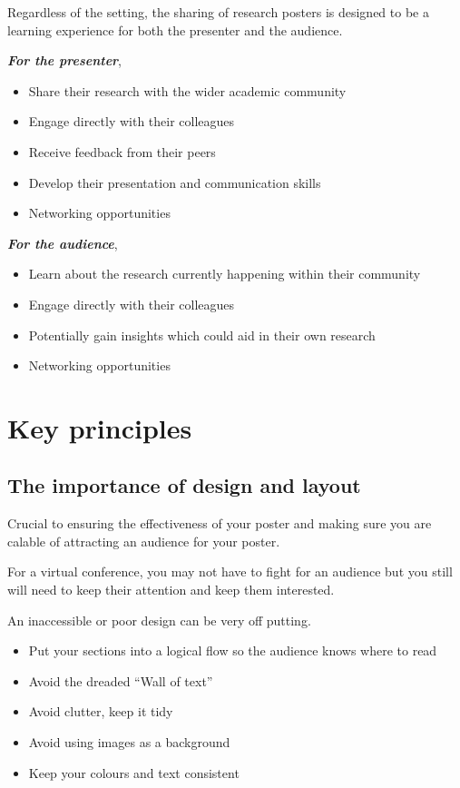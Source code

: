 \documentclass[
]{book}
\providecommand{\tightlist}{%
  \setlength{\itemsep}{0pt}\setlength{\parskip}{0pt}}
\begin{document}
Regardless of the setting, the sharing of research posters is designed to be a learning experience for both the presenter and the audience.

\textbf{\emph{For the presenter}},

\begin{itemize}
\tightlist
\item
  Share their research with the wider academic community
\item
  Engage directly with their colleagues
\item
  Receive feedback from their peers
\item
  Develop their presentation and communication skills
\item
  Networking opportunities
\end{itemize}

\textbf{\emph{For the audience}},

\begin{itemize}
\tightlist
\item
  Learn about the research currently happening within their community
\item
  Engage directly with their colleagues
\item
  Potentially gain insights which could aid in their own research
\item
  Networking opportunities
\end{itemize}

\hypertarget{key-principles}{%
\section{Key principles}\label{key-principles}}

\hypertarget{the-importance-of-design-and-layout}{%
\subsection{The importance of design and layout}\label{the-importance-of-design-and-layout}}

Crucial to ensuring the effectiveness of your poster and making sure you are calable of attracting an audience for your poster.

For a virtual conference, you may not have to fight for an audience but you still will need to keep their attention and keep them interested.

An inaccessible or poor design can be very off putting.

\begin{itemize}
\tightlist
\item
  Put your sections into a logical flow so the audience knows where to read
\item
  Avoid the dreaded ``Wall of text''
\item
  Avoid clutter, keep it tidy
\item
  Avoid using images as a background
\item
  Keep your colours and text consistent
\end{itemize}
\end{document}
